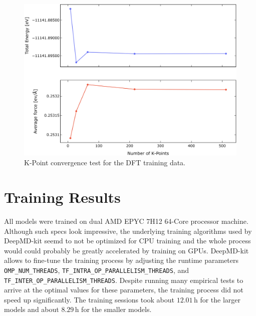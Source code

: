 \begin{figure}
  \begin{center}
    \includegraphics[width=.8\textwidth]{
      asset/kpoint_convergence.jpg
    }
  \end{center}
  \caption{K-Point convergence test for the DFT training data.}
  \label{fig:dft_kpoint_convergence}
\end{figure}

\section{Training Results}

All models were trained on dual AMD EPYC 7H12 64-Core processor machine.
Although such specs look impressive, the underlying training algorithms used
by DeepMD-kit seemd to not be optimized for CPU training and the whole process
would could probably be greatly accelerated by training on GPUs. DeepMD-kit
allows to fine-tune the training process by adjusting the runtime parameters
\texttt{OMP\_NUM\_THREADS}, \texttt{TF\_INTRA\_OP\_PARALLELISM\_THREADS}, and
\texttt{TF\_INTER\_OP\_PARALLELISM\_THREADS}. Despite running many empirical
tests to arrive at the optimal values for these parameters, the training
process did not speed up significantly. The training sessions took about
$12.01 \, \mathrm{h}$ for the larger models and about $8.29 \, \mathrm{h}$ for
the smaller models.

